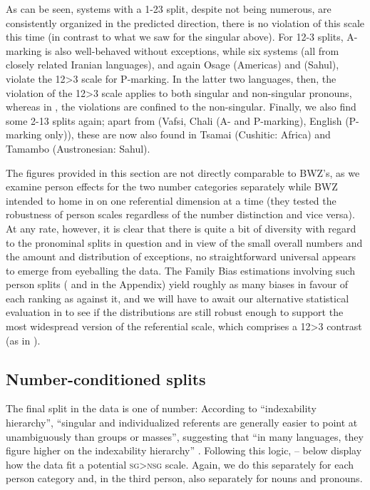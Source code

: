 \documentclass[output=paper]{langscibook}
\begin{document}
As can be seen, systems with a 1-23 split, despite not being numerous, are consistently organized in the predicted direction, \ie there is no violation of this scale this time (in contrast to what we saw for the singular above). For 12-3 splits, A-marking is also well-behaved without exceptions, while six  systems (all from closely related Iranian languages), and again Osage (Americas) and  (Sahul), violate the 12>3 scale for P-marking. In the latter two languages, then, the violation of the 12>3 scale applies to both singular and non-singular pronouns, whereas in , the violations are confined to the non-singular. Finally, we also find some 2-13 splits again; apart from  (Vafsi, Chali (A- and P-marking), English (P-marking only)), these are now also found in Tsamai (Cushitic: Africa) and Tamambo (Austronesian: Sahul).

The figures provided in this section are not directly comparable to BWZ’s, as we examine person effects for the two number categories separately while BWZ intended to home in on one referential dimension at a time (\ie they tested the robustness of person scales regardless of the number distinction and vice versa). At any rate, however, it is clear that there is quite a bit of diversity with regard to the pronominal splits in question and in view of the small overall numbers and the amount and distribution of exceptions, no straightforward universal appears to emerge from eyeballing the data. The Family Bias estimations involving such person splits (\cf {} and  in the Appendix) yield roughly as many biases in favour of each ranking as against it, and we will have to await our alternative statistical evaluation in  to see if the distributions are still robust enough to support the most widespread version of the referential scale, which comprises a 12>3 contrast (as in ).

\subsection{Number-conditioned splits}
\label{18-sc-subsec:2-6}

The final split in the data is one of number: According to  “indexability hierarchy”, “singular and individualized referents are generally easier to point at unambiguously than groups or masses”, suggesting that “in many languages, they figure higher on the indexability hierarchy” \citep[225]{Bickeletal2002Autotypologizing}. Following this logic, -- below display how the data fit a potential \textsc{sg>nsg} scale. Again, we do this separately for each person category and, in the third person, also separately for nouns and pronouns.
\end{document}
